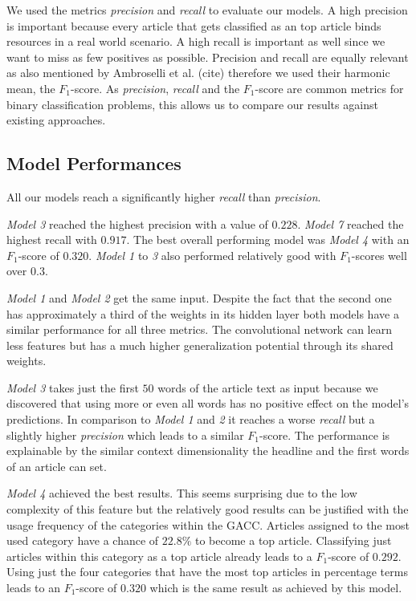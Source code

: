 We used the metrics \textit{precision} and \textit{recall} to evaluate our models. A high precision is important because every article that gets classified as an top article binds resources in a real world scenario. A high recall is important as well since we want to miss as few positives as possible. Precision and recall are equally relevant as also mentioned by Ambroselli et al. (cite) therefore we used their harmonic mean, the $F_1$-score.
As \textit{precision}, \textit{recall} and the $F_1$-score are common metrics for binary classification problems, this allows us to compare our results against existing approaches.

\subsection{Model Performances}
All our models reach a significantly higher \textit{recall} than \textit{precision}.

\textit{Model 3} reached the highest precision with a value of $0.228$. \textit{Model 7} reached the highest recall with $0.917$. The best overall performing model was \textit{Model 4} with an $F_1$-score of $0.320$. \textit{Model 1} to \textit{3} also performed relatively good with $F_1$-scores well over $0.3$.

\textit{Model 1} and \textit{Model 2} get the same input. Despite the fact that the second one has approximately a third of the weights in its hidden layer both models have a similar performance for all three metrics.
The convolutional network can learn less features but has a much higher generalization potential through its shared weights.

\textit{Model 3} takes just the first $50$ words of the article text as input because we discovered that using more or even all words has no positive effect on the model's predictions. In comparison to \textit{Model 1} and \textit{2} it reaches a worse \textit{recall} but a slightly higher \textit{precision} which leads to a similar $F_1$-score.
The performance is explainable by the similar context dimensionality the headline and the first words of an article can set.

\textit{Model 4} achieved the best results. This seems surprising due to the low complexity of this feature but the relatively good results can be justified with the usage frequency of the categories within the GACC. Articles assigned to the most used category have a chance of $22.8\%$ to become a top article. Classifying just articles within this category as a top article already leads to a $F_1$-score of $0.292$. Using just the four categories that have the most top articles in percentage terms leads to an $F_1$-score of $0.320$ which is the same result as achieved by this model.

